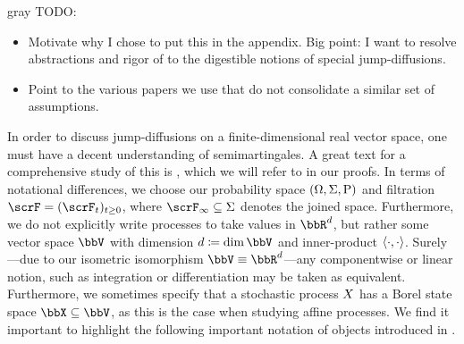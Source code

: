 \begin{color}{gray}
  TODO:
  \begin{itemize}
    \item
      Motivate why I chose to put this in the appendix. Big point: I want to resolve abstractions and rigor of \cite{jacod2003} to the digestible notions of special jump-diffusions.
    \item
      Point to the various papers we use that do not consolidate a similar set of assumptions.
  \end{itemize}
\end{color}

In order to discuss jump-diffusions on a finite-dimensional real vector space, one must have a decent understanding of semimartingales.
A great text for a comprehensive study of this is \cite{jacod2003}, which we will refer to in our proofs.
In terms of notational differences, we choose our probability space $(\Omega, \Sigma, {\operatorname{P}})$ and filtration $\scrF=(\scrF_t)_{t\geq0}$, where $\scrF_\infty \subseteq \Sigma$ denotes the joined space.
Furthermore, we do not explicitly write processes to take values in $\bbR^d$, but rather some vector space $\vecSpace$ with dimension $d \defeq \operatorname{dim}\vecSpace$ and inner-product ${\langle \cdot , \cdot \rangle}$.
Surely---due to our isometric isomorphism $\vecSpace \equiv \bbR^d$---any componentwise or linear notion, such as integration or differentiation may be taken as equivalent.
Furthermore, we sometimes specify that a stochastic process $X$ has a Borel state space $\stateSpace\subseteq \vecSpace$, as this is the case when studying affine processes.
We find it important to highlight the following important notation of objects introduced in \cite[Chapters I-II]{jacod2003}.
